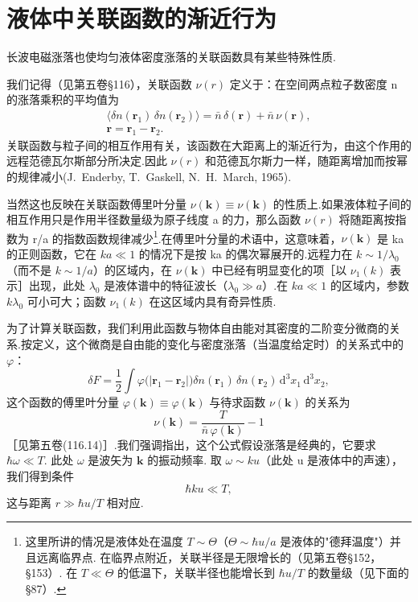 \section{液体中关联函数的渐近行为}

长波电磁涨落也使均匀液体密度涨落的关联函数具有某些特殊性质.

我们记得（见第五卷§116），关联函数 $\nu(r)$ 定义于：在空间两点粒子数密度 n 的涨落乘积的平均值为
\begin{equation}
  \begin{gathered}
    \bigl\langle\delta n(\bm{r}_1)\,\delta n(\bm{r}_2)\bigr\rangle=\bar{n}\,\delta(\bm{r})+\bar{n}\,\nu(\bm{r}),\\
    \bm{r}=\bm{r}_1-\bm{r}_2.
  \end{gathered}
\end{equation}
关联函数与粒子间的相互作用有关，该函数在大距离上的渐近行为，由这个作用的远程范德瓦尔斯部分所决定.因此 $\nu(r)$ 和范德瓦尔斯力一样，随距离增加而按幂的规律减小(J.~Enderby, T.~Gaskell, N.~H.~March, 1965).

当然这也反映在关联函数傅里叶分量 $\nu(\bm{k})\equiv\nu(\bm{k})$ 的性质上.如果液体粒子间的相互作用只是作用半径数量级为原子线度 a 的力，那么函数 $\nu(r)$ 将随距离按指数为 r/a 的指数函数规律减少\footnote{这里所讲的情况是液体处在温度 $T\sim\Theta$（$\Theta\sim\hbar u/a$ 是液体的"德拜温度"）并且远离临界点. 在临界点附近，关联半径是无限增长的（见第五卷§152，§153）. 在 $T\ll\Theta$ 的低温下，关联半径也能增长到 $\hbar u/T$ 的数量级（见下面的§87）.}.在傅里叶分量的术语中，这意味着，$\nu(\bm{k})$ 是 ka 的正则函数，它在 $ka\ll 1$ 的情况下是按 ka 的偶次幂展开的.远程力在 $k\sim 1/\lambda_0$（而不是 $k\sim 1/a$）的区域内，在 $\nu(\bm{k})$ 中已经有明显变化的项［以 $\nu_1(k)$ 表示］出现，此处 $\lambda_0$ 是液体谱中的特征波长（$\lambda_0\gg a$）.在 $ka\ll 1$ 的区域内，参数 $k\lambda_0$ 可小可大；函数 $\nu_1(k)$ 在这区域内具有奇异性质.

为了计算关联函数，我们利用此函数与物体自由能对其密度的二阶变分微商的关系.按定义，这个微商是自由能的变化与密度涨落（当温度给定时）的关系式中的 $\varphi$：
\begin{equation}
  \delta F=\frac{1}{2}\int\varphi\bigl(|\bm{r}_1-\bm{r}_2|\bigr)\delta n(\bm{r}_1)\,\delta n(\bm{r}_2)\,\mathrm{d}^{3}x_1\,\mathrm{d}^{3}x_2,
\end{equation}
这个函数的傅里叶分量 $\varphi(\bm{k})\equiv\varphi(\bm{k})$ 与待求函数 $\nu(\bm{k})$ 的关系为
\begin{equation}
  \nu(\bm{k})=\frac{T}{\bar{n}\,\varphi(\bm{k})}-1
\end{equation}
［见第五卷(116.14)］.我们强调指出，这个公式假设涨落是经典的，它要求 $\hbar\omega\ll T$. 此处 $\omega$ 是波矢为 $\bm{k}$ 的振动频率. 取 $\omega\sim ku$（此处 u 是液体中的声速），我们得到条件
\begin{equation}
  \hbar ku\ll T,
\end{equation}
这与距离 $r\gg\hbar u/T$ 相对应.

